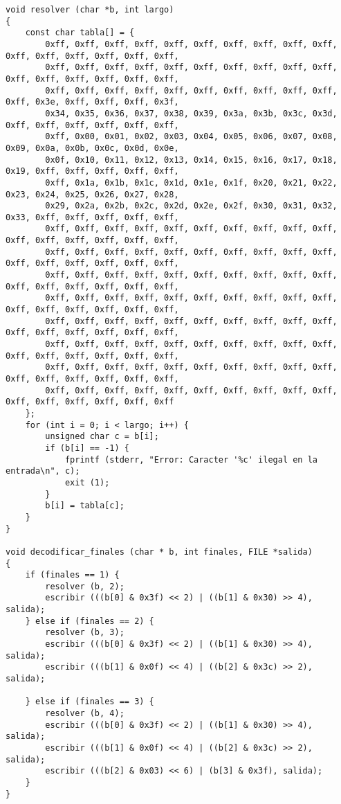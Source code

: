\documentclass[a4paper,11pt, margin=1in]{article}
\begin{document}
\begin{verbatim}
void resolver (char *b, int largo)
{
	const char tabla[] = {
		0xff, 0xff, 0xff, 0xff, 0xff, 0xff, 0xff, 0xff, 0xff, 0xff, 0xff, 0xff, 0xff, 0xff, 0xff, 0xff, 
		0xff, 0xff, 0xff, 0xff, 0xff, 0xff, 0xff, 0xff, 0xff, 0xff, 0xff, 0xff, 0xff, 0xff, 0xff, 0xff, 
		0xff, 0xff, 0xff, 0xff, 0xff, 0xff, 0xff, 0xff, 0xff, 0xff, 0xff, 0x3e, 0xff, 0xff, 0xff, 0x3f, 
		0x34, 0x35, 0x36, 0x37, 0x38, 0x39, 0x3a, 0x3b, 0x3c, 0x3d, 0xff, 0xff, 0xff, 0xff, 0xff, 0xff, 
		0xff, 0x00, 0x01, 0x02, 0x03, 0x04, 0x05, 0x06, 0x07, 0x08, 0x09, 0x0a, 0x0b, 0x0c, 0x0d, 0x0e, 
		0x0f, 0x10, 0x11, 0x12, 0x13, 0x14, 0x15, 0x16, 0x17, 0x18, 0x19, 0xff, 0xff, 0xff, 0xff, 0xff, 
		0xff, 0x1a, 0x1b, 0x1c, 0x1d, 0x1e, 0x1f, 0x20, 0x21, 0x22, 0x23, 0x24, 0x25, 0x26, 0x27, 0x28, 
		0x29, 0x2a, 0x2b, 0x2c, 0x2d, 0x2e, 0x2f, 0x30, 0x31, 0x32, 0x33, 0xff, 0xff, 0xff, 0xff, 0xff, 
		0xff, 0xff, 0xff, 0xff, 0xff, 0xff, 0xff, 0xff, 0xff, 0xff, 0xff, 0xff, 0xff, 0xff, 0xff, 0xff, 
		0xff, 0xff, 0xff, 0xff, 0xff, 0xff, 0xff, 0xff, 0xff, 0xff, 0xff, 0xff, 0xff, 0xff, 0xff, 0xff, 
		0xff, 0xff, 0xff, 0xff, 0xff, 0xff, 0xff, 0xff, 0xff, 0xff, 0xff, 0xff, 0xff, 0xff, 0xff, 0xff, 
		0xff, 0xff, 0xff, 0xff, 0xff, 0xff, 0xff, 0xff, 0xff, 0xff, 0xff, 0xff, 0xff, 0xff, 0xff, 0xff, 
		0xff, 0xff, 0xff, 0xff, 0xff, 0xff, 0xff, 0xff, 0xff, 0xff, 0xff, 0xff, 0xff, 0xff, 0xff, 0xff, 
		0xff, 0xff, 0xff, 0xff, 0xff, 0xff, 0xff, 0xff, 0xff, 0xff, 0xff, 0xff, 0xff, 0xff, 0xff, 0xff, 
		0xff, 0xff, 0xff, 0xff, 0xff, 0xff, 0xff, 0xff, 0xff, 0xff, 0xff, 0xff, 0xff, 0xff, 0xff, 0xff, 
		0xff, 0xff, 0xff, 0xff, 0xff, 0xff, 0xff, 0xff, 0xff, 0xff, 0xff, 0xff, 0xff, 0xff, 0xff, 0xff
	};
	for (int i = 0; i < largo; i++) {
		unsigned char c = b[i];
		if (b[i] == -1) {
			fprintf (stderr, "Error: Caracter '%c' ilegal en la entrada\n", c);
			exit (1);
		}
		b[i] = tabla[c];
	}
}

void decodificar_finales (char * b, int finales, FILE *salida)
{
	if (finales == 1) {
		resolver (b, 2);
		escribir (((b[0] & 0x3f) << 2) | ((b[1] & 0x30) >> 4), salida);
	} else if (finales == 2) {
		resolver (b, 3);
		escribir (((b[0] & 0x3f) << 2) | ((b[1] & 0x30) >> 4), salida);
		escribir (((b[1] & 0x0f) << 4) | ((b[2] & 0x3c) >> 2), salida);

	} else if (finales == 3) {
		resolver (b, 4);
		escribir (((b[0] & 0x3f) << 2) | ((b[1] & 0x30) >> 4), salida);
		escribir (((b[1] & 0x0f) << 4) | ((b[2] & 0x3c) >> 2), salida);
		escribir (((b[2] & 0x03) << 6) | (b[3] & 0x3f), salida);
	}
}


\end{verbatim}
\end{document}

